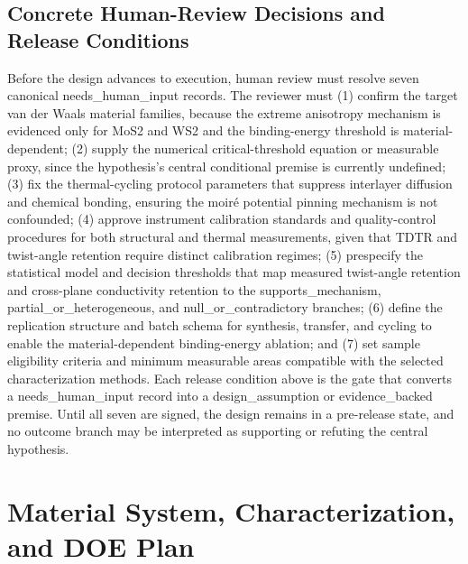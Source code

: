 \documentclass[conference]{IEEEtran}
\begin{document}
\subsection{Concrete Human-Review Decisions and Release Conditions}
Before the design advances to execution, human review must resolve seven canonical needs\_human\_input records. The reviewer must (1) confirm the target van der Waals material families, because the extreme anisotropy mechanism is evidenced only for MoS2 and WS2 and the binding-energy threshold is material-dependent; (2) supply the numerical critical-threshold equation or measurable proxy, since the hypothesis's central conditional premise is currently undefined; (3) fix the thermal-cycling protocol parameters that suppress interlayer diffusion and chemical bonding, ensuring the moiré potential pinning mechanism is not confounded; (4) approve instrument calibration standards and quality-control procedures for both structural and thermal measurements, given that TDTR and twist-angle retention require distinct calibration regimes; (5) prespecify the statistical model and decision thresholds that map measured twist-angle retention and cross-plane conductivity retention to the supports\_mechanism, partial\_or\_heterogeneous, and null\_or\_contradictory branches; (6) define the replication structure and batch schema for synthesis, transfer, and cycling to enable the material-dependent binding-energy ablation; and (7) set sample eligibility criteria and minimum measurable areas compatible with the selected characterization methods. Each release condition above is the gate that converts a needs\_human\_input record into a design\_assumption or evidence\_backed premise. Until all seven are signed, the design remains in a pre-release state, and no outcome branch may be interpreted as supporting or refuting the central hypothesis.~\cite{cite_26ecaf73d88dfe33}

\section{Material System, Characterization, and DOE Plan}
\end{document}
